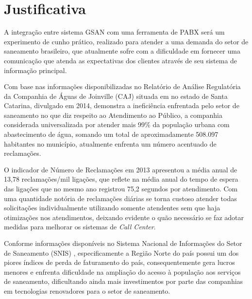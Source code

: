 \section*{Justificativa}
A integração entre sistema GSAN com uma ferramenta de PABX será um experimento de cunho prático, realizado para atender a uma demanda do setor de saneamento brasileiro, que atualmente sofre com a dificuldade em fornecer uma comunicação que atenda as expectativas dos clientes através de seu sistema de informação principal.

Com base nas informações disponibilizadas no Relatório de Análise Regulatória da Companhia de Águas de Joinville (CAJ) \cite{AMAE2014} 
situada em no estado de Santa Catarina, divulgado em 2014, demonstra a ineficiência enfrentada pelo setor de saneamento no que diz respeito ao Atendimento ao Público, a companhia considerada universalizada por atender mais 99\% da população urbana com abastecimento de água, somando um total de aproximadamente 508.097 habitantes no município, atualmente enfrenta um número acentuado de reclamações.




 O indicador de Número de Reclamações em 2013 apresentou a média anual de 13,78 reclamações/mil ligações, que reflete na média anual do tempo de espera das ligações que no mesmo ano registrou 75,2 segundos por atendimento. Com uma quantidade notória de reclamações diárias se torna custoso atender todas solicitações individualmente utilizando somente atendentes sem que haja otimizações nos atendimentos,   deixando evidente o quão necessário se faz adotar medidas para melhorar os sistemas de \textit{Call Center}. 
 
 Conforme informações disponíveis no Sistema Nacional de Informações do Setor de Saneamento (SNIS) \cite{SNIS:2014}, especificamente a Região Norte do país possui um dos piores índices de perda de faturamento do país, consequentemente gera lucros menores e enfrenta dificuldade na ampliação do acesso à população aos serviços de saneamento, dificultando ainda mais investimentos por parte das companhias em tecnologias renovadores para o setor de saneamento.
 
